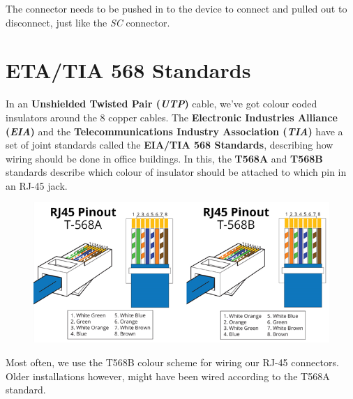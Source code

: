 \noindent
The connector needs to be pushed in to the device to connect and pulled out to disconnect, just like the \textit{SC} connector. 

\section{ETA/TIA 568 Standards}
In an \textbf{Unshielded Twisted Pair (\textit{UTP})} cable, we've got colour coded insulators around the 8 copper cables. The \textbf{Electronic Industries Alliance (\textit{EIA})} and the \textbf{Telecommunications Industry Association (\textit{TIA})} have a set of joint standards called the \textbf{EIA/TIA 568 Standards}, describing how wiring should be done in office buildings. In this, the \textbf{T568A} and \textbf{T568B} standards describe which colour of insulator should be attached to which pin in an RJ-45 jack. 

\begin{figure}[H]
	\centering
	\includegraphics[width=1\linewidth]{"Mod1/chapters/1.4.o T568A-T568B Pinout"}
	\label{fig:t568ab_pinout}
\end{figure}

\noindent
Most often, we use the T568B colour scheme for wiring our RJ-45 connectors. Older installations however, might have been wired according to the T568A standard. 
